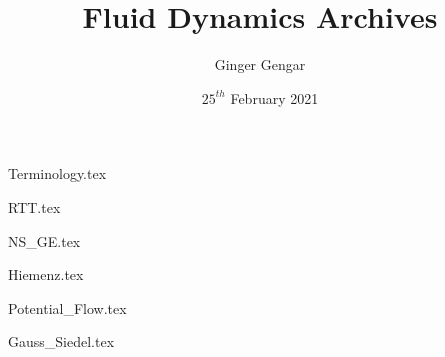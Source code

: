 \documentclass[a4paper, 12pt]{report}
\begin{document}
\title{Fluid Dynamics Archives}
\author{Ginger Gengar}
\date{$25^{th}$ February 2021}
\maketitle
\newpage

\tableofcontents

\begin{center}
{Terminology.tex}
\begin{comment}
Start Level: Chapter
End Level: Chapter
Aditional Comments:
\end{comment}
{RTT.tex}
\begin{comment}
Start Level: Chapter
End Level: Chapter
Aditional Comments:
\end{comment}
{NS_GE.tex}
\begin{comment}
Start Level: Chapter
End Level: Chapter
Aditional Comments:
\end{comment}
{Hiemenz.tex}
\begin{comment}
Start Level: Chapter
End Level: Chapter
Aditional Comments:
\end{comment}
{Potential_Flow.tex}
\begin{comment}
Start Level: Chapter
End Level: Chapter
Aditional Comments:
\end{comment}
{Gauss_Siedel.tex}
\begin{comment}

\end{comment}
\end{center}
\end{document}

